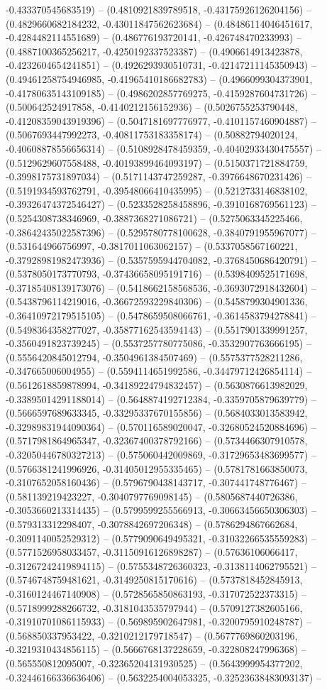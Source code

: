 -0.433370545683519) -- (0.4810921839789518, -0.43175926126204156) -- (0.4829660682184232, -0.43011847562623684) -- (0.48486114046451617, -0.4284482114551689) -- (0.486776193720141, -0.426748470233993) -- (0.4887100365256217, -0.4250192337523387) -- (0.4906614913423878, -0.4232604654241851) -- (0.4926293930510731, -0.42147211145350943) -- (0.49461258754946985, -0.41965410186682783) -- (0.4966099304373901, -0.41780635143109185) -- (0.4986202857769275, -0.4159287604731726) -- (0.500642524917858, -0.4140212156152936) -- (0.5026755253790448, -0.41208359043919396) -- (0.5047181697776977, -0.4101157460904887) -- (0.5067693447992273, -0.40811753183358174) -- (0.50882794020124, -0.40608878556656314) -- (0.5108928478459359, -0.40402933430475557) -- (0.5129629607558488, -0.40193899464093197) -- (0.5150371721884759, -0.3998175731897034) -- (0.5171143747259287, -0.3976648670231426) -- (0.5191934593762791, -0.39548066410435995) -- (0.5212733146838102, -0.39326474372546427) -- (0.5233528258458896, -0.3910168769561123) -- (0.5254308738346969, -0.3887368271086721) -- (0.5275063345225466, -0.38642435022587396) -- (0.5295780778100628, -0.3840791955967077) -- (0.531644966756997, -0.3817011063062157) -- (0.5337058567160221, -0.37928981982473936) -- (0.5357595944704082, -0.3768450686420791) -- (0.5378050173770793, -0.37436658095191716) -- (0.5398409525171698, -0.37185408139173076) -- (0.5418662158568536, -0.3693072918432604) -- (0.5438796114219016, -0.36672593229840306) -- (0.5458799304901336, -0.36410972179515105) -- (0.5478659508066761, -0.3614583794278841) -- (0.5498364358277027, -0.35877162543594143) -- (0.5517901339991257, -0.3560491823739245) -- (0.5537257780775086, -0.3532907763666195) -- (0.5556420845012794, -0.3504961384507469) -- (0.5575377528211286, -0.347665006004955) -- (0.5594114651992586, -0.34479712426854114) -- (0.5612618859878994, -0.34189224794832457) -- (0.5630876613982029, -0.33895014291188014) -- (0.5648874192712384, -0.3359705879639779) -- (0.5666597689633345, -0.33295337670155856) -- (0.5684033013583942, -0.32989831944090364) -- (0.570116589020047, -0.32680524520884696) -- (0.5717981864965347, -0.32367400378792166) -- (0.5734466307910578, -0.32050446780327213) -- (0.575060442009869, -0.31729653483699577) -- (0.5766381241996926, -0.31405012955335465) -- (0.5781781663850073, -0.3107652058160436) -- (0.5796790438143717, -0.307441748776467) -- (0.581139219423227, -0.3040797769098145) -- (0.5805687440726386, -0.3053660213314435) -- (0.5799599255566913, -0.30663456650306303) -- (0.579313312298407, -0.3078842697206348) -- (0.5786294867662684, -0.3091140052529312) -- (0.5779090649495321, -0.31032266535559283) -- (0.5771526958033457, -0.31150916126898287) -- (0.57636106066417, -0.31267242419894115) -- (0.5755348726360323, -0.3138114062795521) -- (0.5746748759481621, -0.3149250815170616) -- (0.5737818452845913, -0.3160124467140908) -- (0.5728565850863193, -0.317072522373315) -- (0.5718999288266732, -0.3181043535797944) -- (0.5709127382605166, -0.31910701086115933) -- (0.569895902647981, -0.3200795910248787) -- (0.568850337953422, -0.3210212179718547) -- (0.5677769860203196, -0.3219310434856115) -- (0.5666768137228659, -0.322808247996368) -- (0.565550812095007, -0.32365204131930525) -- (0.5643999954377202, -0.32446166336636406) -- (0.5632254004053325, -0.32523638483093137) -- 